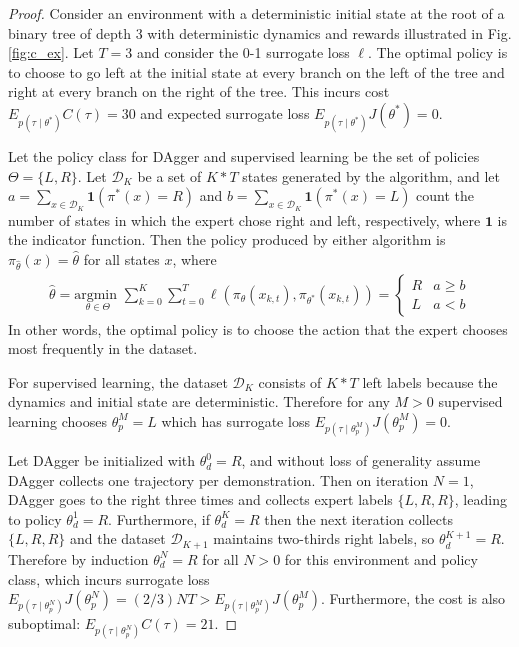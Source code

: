 \documentclass[10pt, conference]{ieeeconf}      %
\newcommand{\mD}{\mathcal{D}}
\begin{document}
\begin{proof}
Consider an environment with a deterministic initial state at the root of a binary tree of depth 3 with deterministic dynamics and rewards illustrated in Fig. \ref{fig:c_ex}.
Let $T = 3$ and consider the 0-1 surrogate loss $\ell$.
The optimal policy is to choose to go left at the initial state at every branch on the left of the tree and right at every branch on the right of the tree.
This incurs cost $E_{p(\tau \mid \theta^*)} C(\tau) = 30$ and expected surrogate loss $E_{p(\tau \mid \theta^*)} J(\theta^*) = 0$.

Let the policy class for DAgger and supervised learning be the set of policies $\Theta = \{L, R\}$.
Let $\mD_K$ be a set of $K * T$ states generated by the algorithm, and let $a = \sum_{x \in \mD_K} \mathbf{1}(\pi^*(x) = R)$ and $b = \sum_{x \in \mD_K} \mathbf{1}(\pi^*(x) = L)$ count the number of states in which the expert chose right and left, respectively, where $\mathbf{1}$ is the indicator function. 
Then the policy produced by either algorithm is $\pi_{\hat{\theta}}(x) = \hat{\theta}$ for all states $x$, where
\vspace{-2ex}
\begin{align*}
	\hat{\theta} = \underset{\theta \in \Theta}{\text{argmin }} \sum_{k=0}^K \sum_{t=0}^T \ell(\pi_{\theta}(x_{k,t}), \pi_{\theta^*}(x_{k,t})) = \left\{ \begin{array}{cc} R & a \geq b \\ L & a < b \end{array} \right.
\end{align*}
\noindent In other words, the optimal policy is to choose the action that the expert chooses most frequently in the dataset.

For supervised learning, the dataset $\mD_K$ consists of $K * T$ left labels because the dynamics and initial state are deterministic.
Therefore for any $M > 0$ supervised learning chooses $\theta_{p}^M = L$ which has surrogate loss $E_{p(\tau \mid \theta_{p}^M)} J(\theta_{p}^M) = 0$.

Let DAgger be initialized with $\theta_d^0 = R$, and without loss of generality assume DAgger collects one trajectory per demonstration.
Then on iteration $N=1$, DAgger goes to the right three times and collects expert labels $\{L, R, R\}$, leading to policy $\theta_{d}^1 = R$.
Furthermore, if $\theta_{d}^K = R$ then the next iteration collects $\{L, R, R\}$ and the dataset $\mD_{K+1}$ maintains two-thirds right labels, so $\theta_{d}^{K+1} = R$.
Therefore by induction $\theta_{d}^{N} = R$ for all $N > 0$ for this environment and policy class, which incurs surrogate loss $E_{p(\tau \mid \theta_{p}^N)} J(\theta_{p}^N) = (2 / 3) N T > E_{p(\tau \mid \theta_{p}^M)} J(\theta_{p}^M)$.
Furthermore, the cost is also suboptimal: $E_{p(\tau \mid \theta_{p}^N)} C(\tau) = 21$.
\end{proof}
\end{document}
